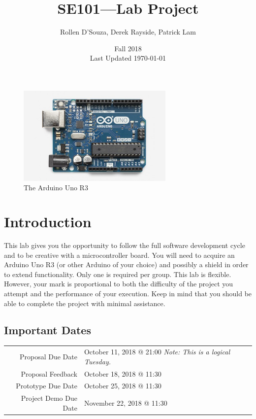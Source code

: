 \documentclass{article}
\begin{document}
\title{\vspace{-0.5in}SE101---Lab Project}
\author{Rollen D'Souza, Derek Rayside, Patrick Lam}
\date{Fall 2018\\Last Updated \today}
\maketitle

\begin{figure}[ht]
\centering
\includegraphics[width=3in]{images/Uno.jpg}
\caption{The Arduino Uno R3~\cite{arduinoUno}}
\label{fig:arduinoUno}
\end{figure}

\section*{Introduction}
This lab gives you the opportunity to follow the full software development cycle and to be creative with a microcontroller board.  You will need to acquire an Arduino Uno R3 (or other Arduino of your choice) and possibly a shield in order to extend functionality.  Only one is required per group.  This lab is flexible.  However, your mark is proportional to both the difficulty of the project you attempt and the performance of your execution.  Keep in mind that you should be able to complete the project with minimal assistance.

\subsection*{Important Dates}
\begin{tabular}{rl}
Proposal Due Date & October 11, 2018 @ 21:00 \quad \emph{Note: This is a logical Tuesday.}\\
Proposal Feedback & October 18, 2018 @ 11:30\\
Prototype Due Date & October 25, 2018 @ 11:30\\
Project Demo Due Date & November 22, 2018 @ 11:30
\end{tabular}
\end{document}
